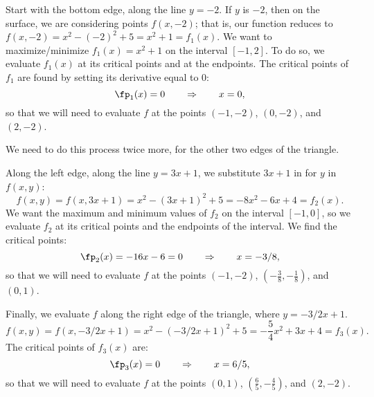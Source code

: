 {Start with the bottom edge, along the line $y=-2$. If $y$ is $-2$, then on the surface, we are considering points $f(x,-2)$; that is, our function reduces to $f(x,-2) = x^2-(-2)^2+5 = x^2+1=f_1(x)$. We want to maximize/minimize $f_1(x)=x^2+1$ on the interval $[-1,2]$. To do so, we evaluate $f_1(x)$ at its critical points and at the endpoints.  The critical points of $f_1$ are found by setting its derivative equal to 0:
\[\fp_1(x)=0\qquad \Rightarrow\qquad x=0,\]
so that we will need to evaluate $f$ at the points $(-1,-2)$, $(0,-2)$, and $(2,-2)$.

We need to do this process twice more, for the other two edges of the triangle.

Along the left edge, along the line $y=3x+1$, we substitute $3x+1$ in for $y$ in $f(x,y)$:
\[f(x,y) = f(x,3x+1) = x^2-(3x+1)^2+5 = -8x^2-6x+4 = f_2(x).\]
We want the maximum and minimum values of $f_2$ on the interval $[-1,0]$, so we evaluate $f_2$ at its critical points and the endpoints of the interval. We find the critical points:
\[\fp_2(x) = -16x-6=0 \qquad \Rightarrow \qquad x=-3/8,\]
so that we will need to evaluate $f$ at the points $(-1,-2)$, $(-\frac38,-\frac18)$, and $(0,1)$.


Finally, we evaluate $f$ along the right edge of the triangle, where $y = -3/2x+1$. 
\[f(x,y) = f(x,-3/2x+1) = x^2-(-3/2x+1)^2+5 = -\frac54x^2+3x+4=f_3(x).\]
The critical points of $f_3(x)$ are:
\[\fp_3(x) = 0 \qquad \Rightarrow \qquad x=6/5,\]%
so that we will need to evaluate $f$ at the points $(0,1)$, $(\frac65,-\frac45)$, and $(2,-2)$.

}
